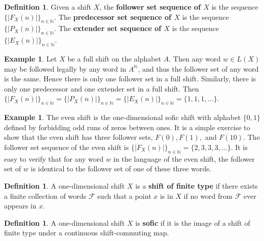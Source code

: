 \documentclass{amsart}
\theoremstyle{definition}
\newtheorem{definition}[theorem]{Definition}
\newtheorem{example}[theorem]{Example}
\numberwithin{equation}{section}
\begin{document}
\begin{definition}
Given a shift $X$, the \textbf{follower set sequence of $X$} is the sequence $\{|F_X(n)|\}_{n \in \mathbb{N}}$. The \textbf{predecessor set sequence of $X$} is the sequence $\{|P_X(n)|\}_{n \in \mathbb{N}}$. The \textbf{extender set sequence of $X$} is the sequence $\{|E_X(n)|\}_{n \in \mathbb{N}}$.
\end{definition}

\begin{example}
Let $X$ be a full shift on the alphabet $A$. Then any word $w \in L(X)$ may be followed legally by any word in $A^{\mathbb{N}}$, and thus the follower set of any word is the same. Hence there is only one follower set in a full shift. Similarly, there is only one predecessor and one extender set in a full shift. Then $\{|F_X(n)|\}_{n \in \mathbb{N}} = \{|P_X(n)|\}_{n \in \mathbb{N}} = \{|E_X(n)|\}_{n \in \mathbb{N}} = \{1, 1, 1, ...\}$.
\end{example}

\begin{example}
The even shift is the one-dimensional sofic shift with alphabet $\{0,1\}$ defined by forbidding odd runs of zeros between ones. It is a simple exercise to show that the even shift has three follower sets, $F(0), F(1),$ and $F(10)$. The follower set sequence of the even shift is $\{|F_X(n)|\}_{n \in \mathbb{N}} = \{2, 3, 3, 3, ...\}$. It is easy to verify that for any word $w$ in the language of the even shift, the follower set of $w$ is identical to the follower set of one of these three words.
\end{example}

\begin{definition} 
A one-dimensional shift $X$ is a \textbf{shift of finite type} if there exists a finite collection of words $\mathcal{F}$ such that a point $x$ is in $X$ if no word from $\mathcal{F}$ ever appears in $x$.
\end{definition}

\begin{definition}
A one-dimensional shift $X$ is \textbf{sofic} if it is the image of a shift of finite type under a continuous shift-commuting map. 
\end{definition}
\end{document}

